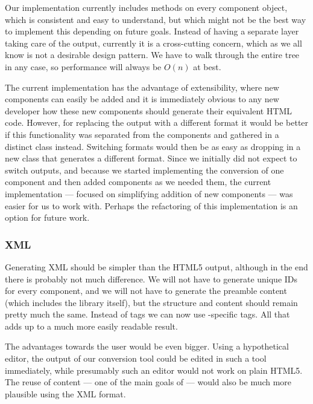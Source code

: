      Our implementation currently includes  methods on every
     component object, which is consistent and easy to understand, but which
     might not be the best way to implement this depending on future goals.
     Instead of having a separate layer taking care of the output, currently it
     is a cross-cutting concern, which as we all know is not a desirable design
     pattern. We have to walk through the entire tree in any case, so
     performance will always be $O(n)$ at best.
    
     The current implementation has the advantage of extensibility, where new
     components can easily be added and it is immediately obvious to any new
     developer how these new components should generate their equivalent HTML
     code. However, for replacing the output with a different format it would
     be better if this functionality was separated from the components and
     gathered in a distinct  class instead. Switching formats
     would then be as easy as dropping in a new  class that
     generates a different format. Since we initially did not expect to switch
     outputs, and because we started implementing the conversion of one
     component and then added components as we needed them, the current
     implementation --- focused on simplifying addition of new components ---
     was easier for us to work with. Perhaps the refactoring of this
     implementation is an option for future work.

    \subsubsection{\mxp XML}

     Generating \mxp XML should be simpler than the HTML5 output, although in
     the end there is probably not much difference. We will not have to generate
     unique IDs for every component, and we will not have to generate the
     preamble content (which includes the \mxp library itself), but the
     structure and content should remain pretty much the same. Instead of
      tags we can now use \mxp-specific tags. All that adds up to a
     much more easily readable result.

     The advantages towards the user would be even bigger. Using a hypothetical
     \mxp editor, the output of our conversion tool could be edited in such a
     tool immediately, while presumably such an editor would not work on plain
     HTML5. The reuse of content --- one of the main goals of \mxp --- would
     also be much more plausible using the XML format.

